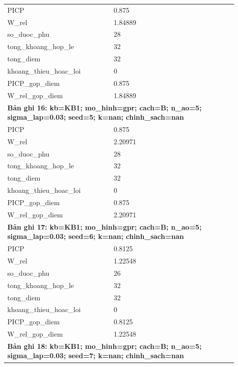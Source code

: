 \begin{longtable}{p{0.43\linewidth}p{0.50\linewidth}}
PICP & 0.875 \\
W\_\allowbreak rel & 1.84889 \\
so\_\allowbreak duoc\_\allowbreak phu & 28 \\
tong\_\allowbreak khoang\_\allowbreak hop\_\allowbreak le & 32 \\
tong\_\allowbreak diem & 32 \\
khoang\_\allowbreak thieu\_\allowbreak hoac\_\allowbreak loi & 0 \\
PICP\_\allowbreak gop\_\allowbreak diem & 0.875 \\
W\_\allowbreak rel\_\allowbreak gop\_\allowbreak diem & 1.84889 \\
\midrule
\multicolumn{2}{p{0.95\linewidth}}{\textbf{Bản ghi 16: kb=KB1; mo\_hinh=gpr; cach=B; n\_ao=5; sigma\_lap=0.03; seed=5; k=nan; chinh\_sach=nan}} \\
PICP & 0.875 \\
W\_\allowbreak rel & 2.20971 \\
so\_\allowbreak duoc\_\allowbreak phu & 28 \\
tong\_\allowbreak khoang\_\allowbreak hop\_\allowbreak le & 32 \\
tong\_\allowbreak diem & 32 \\
khoang\_\allowbreak thieu\_\allowbreak hoac\_\allowbreak loi & 0 \\
PICP\_\allowbreak gop\_\allowbreak diem & 0.875 \\
W\_\allowbreak rel\_\allowbreak gop\_\allowbreak diem & 2.20971 \\
\midrule
\multicolumn{2}{p{0.95\linewidth}}{\textbf{Bản ghi 17: kb=KB1; mo\_hinh=gpr; cach=B; n\_ao=5; sigma\_lap=0.03; seed=6; k=nan; chinh\_sach=nan}} \\
PICP & 0.8125 \\
W\_\allowbreak rel & 1.22548 \\
so\_\allowbreak duoc\_\allowbreak phu & 26 \\
tong\_\allowbreak khoang\_\allowbreak hop\_\allowbreak le & 32 \\
tong\_\allowbreak diem & 32 \\
khoang\_\allowbreak thieu\_\allowbreak hoac\_\allowbreak loi & 0 \\
PICP\_\allowbreak gop\_\allowbreak diem & 0.8125 \\
W\_\allowbreak rel\_\allowbreak gop\_\allowbreak diem & 1.22548 \\
\midrule
\multicolumn{2}{p{0.95\linewidth}}{\textbf{Bản ghi 18: kb=KB1; mo\_hinh=gpr; cach=B; n\_ao=5; sigma\_lap=0.03; seed=7; k=nan; chinh\_sach=nan}} \\

\end{longtable}
